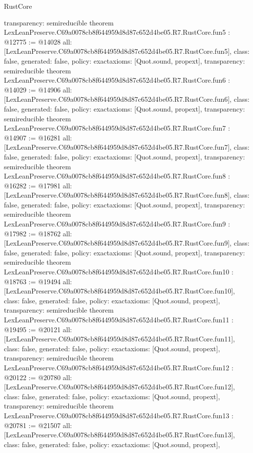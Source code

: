 \begin{lexlean}{RustCore}
\begin{coremodule}
{  transparency: semireducible
}
theorem LexLeanPreserve.C69a0078cb8f644959d8d87c652d4be05.R7.RustCore.fun5 : @12775 := @14028 {
  all: [LexLeanPreserve.C69a0078cb8f644959d8d87c652d4be05.R7.RustCore.fun5],
  class: false,
  generated: false,
  policy: exact{axioms: [Quot.sound, propext]},
  transparency: semireducible
}
theorem LexLeanPreserve.C69a0078cb8f644959d8d87c652d4be05.R7.RustCore.fun6 : @14029 := @14906 {
  all: [LexLeanPreserve.C69a0078cb8f644959d8d87c652d4be05.R7.RustCore.fun6],
  class: false,
  generated: false,
  policy: exact{axioms: [Quot.sound, propext]},
  transparency: semireducible
}
theorem LexLeanPreserve.C69a0078cb8f644959d8d87c652d4be05.R7.RustCore.fun7 : @14907 := @16281 {
  all: [LexLeanPreserve.C69a0078cb8f644959d8d87c652d4be05.R7.RustCore.fun7],
  class: false,
  generated: false,
  policy: exact{axioms: [Quot.sound, propext]},
  transparency: semireducible
}
theorem LexLeanPreserve.C69a0078cb8f644959d8d87c652d4be05.R7.RustCore.fun8 : @16282 := @17981 {
  all: [LexLeanPreserve.C69a0078cb8f644959d8d87c652d4be05.R7.RustCore.fun8],
  class: false,
  generated: false,
  policy: exact{axioms: [Quot.sound, propext]},
  transparency: semireducible
}
theorem LexLeanPreserve.C69a0078cb8f644959d8d87c652d4be05.R7.RustCore.fun9 : @17982 := @18762 {
  all: [LexLeanPreserve.C69a0078cb8f644959d8d87c652d4be05.R7.RustCore.fun9],
  class: false,
  generated: false,
  policy: exact{axioms: [Quot.sound, propext]},
  transparency: semireducible
}
theorem LexLeanPreserve.C69a0078cb8f644959d8d87c652d4be05.R7.RustCore.fun10 : @18763 := @19494 {
  all: [LexLeanPreserve.C69a0078cb8f644959d8d87c652d4be05.R7.RustCore.fun10],
  class: false,
  generated: false,
  policy: exact{axioms: [Quot.sound, propext]},
  transparency: semireducible
}
theorem LexLeanPreserve.C69a0078cb8f644959d8d87c652d4be05.R7.RustCore.fun11 : @19495 := @20121 {
  all: [LexLeanPreserve.C69a0078cb8f644959d8d87c652d4be05.R7.RustCore.fun11],
  class: false,
  generated: false,
  policy: exact{axioms: [Quot.sound, propext]},
  transparency: semireducible
}
theorem LexLeanPreserve.C69a0078cb8f644959d8d87c652d4be05.R7.RustCore.fun12 : @20122 := @20780 {
  all: [LexLeanPreserve.C69a0078cb8f644959d8d87c652d4be05.R7.RustCore.fun12],
  class: false,
  generated: false,
  policy: exact{axioms: [Quot.sound, propext]},
  transparency: semireducible
}
theorem LexLeanPreserve.C69a0078cb8f644959d8d87c652d4be05.R7.RustCore.fun13 : @20781 := @21507 {
  all: [LexLeanPreserve.C69a0078cb8f644959d8d87c652d4be05.R7.RustCore.fun13],
  class: false,
  generated: false,
  policy: exact{axioms: [Quot.sound, propext]},
}
\end{coremodule}
\end{lexlean}

